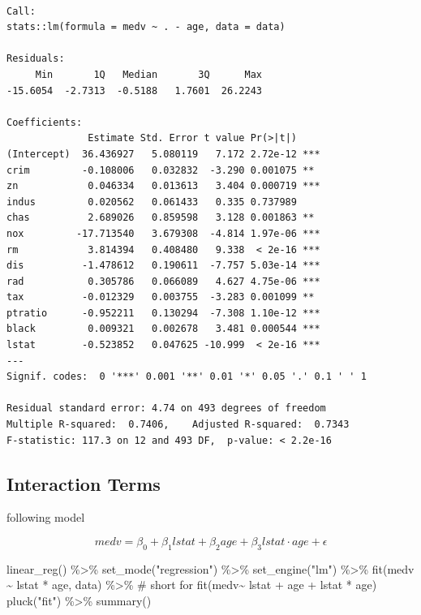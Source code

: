 \documentclass[
  letterpaper,
  DIV=11,
  numbers=noendperiod]{scrreprt}
\newenvironment{Shaded}{\begin{snugshade}}{\end{snugshade}}
\newcommand{\CommentTok}[1]{\textcolor[rgb]{0.41,0.41,0.41}{#1}}
\newcommand{\FunctionTok}[1]{\textcolor[rgb]{0.02,0.16,0.49}{#1}}
\newcommand{\NormalTok}[1]{\textcolor[rgb]{0.33,0.33,0.33}{#1}}
\newcommand{\SpecialCharTok}[1]{\textcolor[rgb]{0.00,0.46,0.62}{#1}}
\newcommand{\StringTok}[1]{\textcolor[rgb]{0.00,0.50,0.00}{#1}}
\begin{document}
\begin{verbatim}

Call:
stats::lm(formula = medv ~ . - age, data = data)

Residuals:
     Min       1Q   Median       3Q      Max 
-15.6054  -2.7313  -0.5188   1.7601  26.2243 

Coefficients:
              Estimate Std. Error t value Pr(>|t|)    
(Intercept)  36.436927   5.080119   7.172 2.72e-12 ***
crim         -0.108006   0.032832  -3.290 0.001075 ** 
zn            0.046334   0.013613   3.404 0.000719 ***
indus         0.020562   0.061433   0.335 0.737989    
chas          2.689026   0.859598   3.128 0.001863 ** 
nox         -17.713540   3.679308  -4.814 1.97e-06 ***
rm            3.814394   0.408480   9.338  < 2e-16 ***
dis          -1.478612   0.190611  -7.757 5.03e-14 ***
rad           0.305786   0.066089   4.627 4.75e-06 ***
tax          -0.012329   0.003755  -3.283 0.001099 ** 
ptratio      -0.952211   0.130294  -7.308 1.10e-12 ***
black         0.009321   0.002678   3.481 0.000544 ***
lstat        -0.523852   0.047625 -10.999  < 2e-16 ***
---
Signif. codes:  0 '***' 0.001 '**' 0.01 '*' 0.05 '.' 0.1 ' ' 1

Residual standard error: 4.74 on 493 degrees of freedom
Multiple R-squared:  0.7406,    Adjusted R-squared:  0.7343 
F-statistic: 117.3 on 12 and 493 DF,  p-value: < 2.2e-16
\end{verbatim}

\hypertarget{interaction-terms}{%
\subsection{Interaction Terms}\label{interaction-terms}}

following model

\[
medv = \beta_0 + \beta_1 lstat + \beta_2 age + \beta_3 lstat \cdot age + \epsilon
\]

\begin{Shaded}
\begin{Highlighting}[]
\FunctionTok{linear\_reg}\NormalTok{() }\SpecialCharTok{\%\textgreater{}\%} 
  \FunctionTok{set\_mode}\NormalTok{(}\StringTok{"regression"}\NormalTok{) }\SpecialCharTok{\%\textgreater{}\%} 
  \FunctionTok{set\_engine}\NormalTok{(}\StringTok{"lm"}\NormalTok{) }\SpecialCharTok{\%\textgreater{}\%} 
  \FunctionTok{fit}\NormalTok{(medv }\SpecialCharTok{\textasciitilde{}}\NormalTok{ lstat }\SpecialCharTok{*}\NormalTok{ age, data) }\SpecialCharTok{\%\textgreater{}\%}  \CommentTok{\# short for fit(medv\textasciitilde{} lstat + age + lstat * age)}
  \FunctionTok{pluck}\NormalTok{(}\StringTok{"fit"}\NormalTok{) }\SpecialCharTok{\%\textgreater{}\%} 
  \FunctionTok{summary}\NormalTok{()}
\end{Highlighting}
\end{Shaded}
\end{document}
